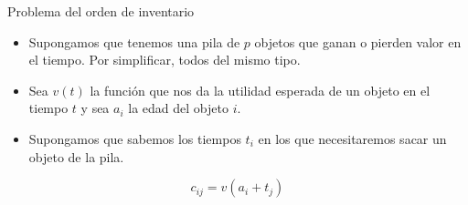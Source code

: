 \documentclass{beamer}
\begin{document}
\begin{frame}{Problema del orden de inventario}
\begin{itemize}
\item Supongamos que tenemos una pila de $p$ objetos que ganan o pierden valor en el tiempo. Por simplificar, todos del mismo tipo.  
\item Sea $v(t)$ la función que nos da la utilidad esperada de un objeto en el tiempo $t$  y sea $a_i$ la edad del objeto $i$.
\item Supongamos que sabemos los tiempos $t_i$ en los que necesitaremos sacar un objeto de la pila. 
\end{itemize}
$$
c_{ij} = v(a_i+t_j)
$$
\end{frame}
\end{document}
